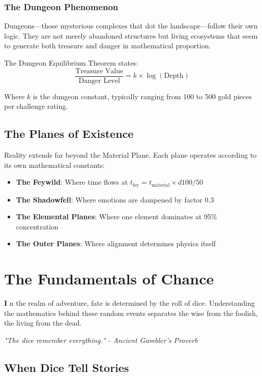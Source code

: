 \documentclass[11pt,letterpaper,openany]{book}
\newcommand{\firstletter}[1]{%
    \textcolor{bloodred}{\fontsize{48}{48}\selectfont\bfseries #1}%
}
\newcommand{\fantasyquote}[1]{%
\begin{center}
\textit{\large #1}
\end{center}
}
\begin{document}
\subsection{The Dungeon Phenomenon}

Dungeons—those mysterious complexes that dot the landscape—follow their own logic. They are not merely abandoned structures but living ecosystems that seem to generate both treasure and danger in mathematical proportion.

The Dungeon Equilibrium Theorem states:
\begin{equation}
\frac{\text{Treasure Value}}{\text{Danger Level}} = k \times \log(\text{Depth})
\end{equation}

Where $k$ is the dungeon constant, typically ranging from 100 to 500 gold pieces per challenge rating.

\section{The Planes of Existence}

Reality extends far beyond the Material Plane. Each plane operates according to its own mathematical constants:

\begin{itemize}
    \item \textbf{The Feywild}: Where time flows at $t_{\text{fey}} = t_{\text{material}} \times d100 / 50$
    \item \textbf{The Shadowfell}: Where emotions are dampened by factor 0.3
    \item \textbf{The Elemental Planes}: Where one element dominates at 95\% concentration
    \item \textbf{The Outer Planes}: Where alignment determines physics itself
\end{itemize}

\chapter{The Fundamentals of Chance}

\firstletter{I}n the realm of adventure, fate is determined by the roll of dice. Understanding the mathematics behind these random events separates the wise from the foolish, the living from the dead.

\fantasyquote{"The dice remember everything." - Ancient Gambler's Proverb}

\section{When Dice Tell Stories}
\end{document}
